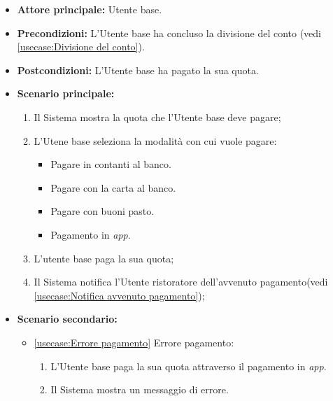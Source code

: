 \label{usecase:Pagamento del conto}
\begin{itemize}
	\item \textbf{Attore principale:} Utente base.

	\item \textbf{Precondizioni:} L'Utente base ha concluso la divisione del conto (vedi \autoref{usecase:Divisione del conto}).

	\item \textbf{Postcondizioni:} L'Utente base ha pagato la sua quota.

	\item \textbf{Scenario principale:}
            \begin{enumerate}
                \item Il Sistema mostra la quota che l'Utente base deve pagare;
                \item L'Utene base seleziona la modalità con cui vuole pagare:
                \begin{itemize}
                    \item Pagare in contanti al banco.
                    \item Pagare con la carta al banco.
                    \item Pagare con buoni pasto.
                    \item Pagamento in \textit{app}.
                \end{itemize}
				\item L'utente base paga la sua quota;
				\item Il Sistema notifica l'Utente ristoratore dell'avvenuto pagamento(vedi \autoref{usecase:Notifica avvenuto pagamento});
	      \end{enumerate}

    \item \textbf{Scenario secondario:}
		  \begin{itemize}
			  \item \autoref{usecase:Errore pagamento} Errore pagamento:
				\begin{enumerate}
					\item L'Utente base paga la sua quota attraverso il pagamento in \textit{app}.
	
					\item  Il Sistema mostra un messaggio di errore.
				\end{enumerate}
		  \end{itemize}
\end{itemize}